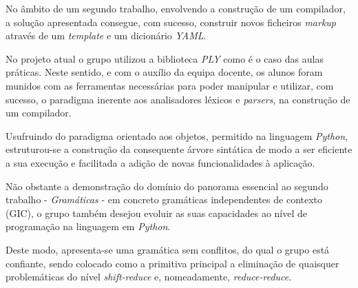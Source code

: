 \documentclass[../relatorio.tex]{subfiles}
\begin{document}
No âmbito de um segundo trabalho, envolvendo a construção de um compilador, 
a solução apresentada consegue, com sucesso, construir novos ficheiros 
\textit{markup} através de um \textit{template} e um dicionário
\textit{YAML}.

No projeto atual o grupo utilizou a biblioteca \textit{PLY} como é o caso das aulas práticas.
Neste sentido, e com o auxílio da equipa docente, os alunos foram munidos com as ferramentas 
necessárias para poder manipular e utilizar, com sucesso, o paradigma inerente aos 
analisadores léxicos e \textit{parsers}, na construção de um compilador.

Usufruindo do paradigma orientado aos objetos, permitido na linguagem \textit{Python},
estruturou-se a construção da consequente árvore sintática de modo a ser eficiente a sua 
execução e facilitada a adição de novas funcionalidades à aplicação.

Não obstante a demonstração do domínio do panorama essencial ao segundo trabalho 
- \textit{Gramáticas} - em concreto gramáticas independentes de contexto (GIC),
o grupo também desejou evoluir as suas capacidades ao nível de programação na 
linguagem em \textit{Python}.

Deste modo, apresenta-se uma gramática sem conflitos, do qual o grupo está 
confiante, sendo colocado como a primitiva principal a eliminação 
de quaisquer problemáticas do nível \textit{shift-reduce} e, nomeadamente,
\textit{reduce-reduce}.
\end{document}
